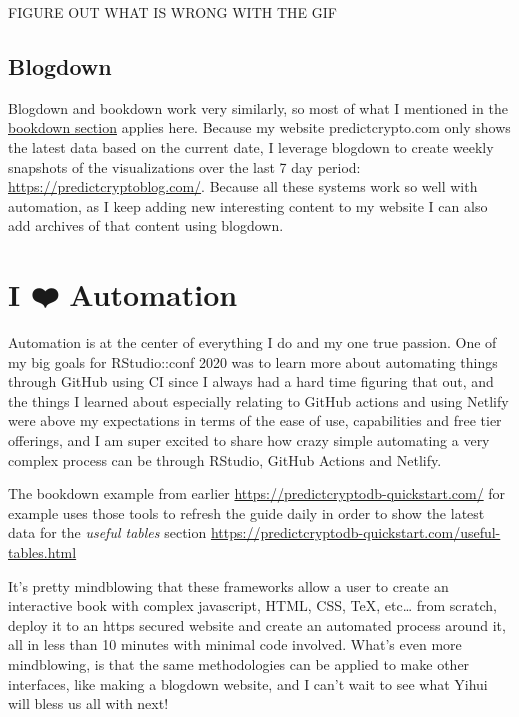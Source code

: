 \documentclass[
]{book}
\begin{document}
FIGURE OUT WHAT IS WRONG WITH THE GIF

\hypertarget{blogdown}{%
\subsection{Blogdown}\label{blogdown}}

Blogdown\citep{R-blogdown} and bookdown work very similarly, so most of what I mentioned in the \protect\hyperlink{bookdown}{bookdown section} applies here. Because my website predictcrypto.com only shows the latest data based on the current date, I leverage blogdown to create weekly snapshots of the visualizations over the last 7 day period: \url{https://predictcryptoblog.com/}. Because all these systems work so well with automation, as I keep adding new interesting content to my website I can also add archives of that content using blogdown.

\hypertarget{automation}{%
\section{I ❤️ Automation}\label{automation}}

Automation is at the center of everything I do and my one true passion. One of my big goals for RStudio::conf 2020 was to learn more about automating things through GitHub using CI since I always had a hard time figuring that out, and the things I learned about especially relating to GitHub actions and using Netlify were above my expectations in terms of the ease of use, capabilities and free tier offerings, and I am super excited to share how crazy simple automating a very complex process can be through RStudio, GitHub Actions and Netlify.

The bookdown example from earlier \url{https://predictcryptodb-quickstart.com/} for example uses those tools to refresh the guide daily in order to show the latest data for the \emph{useful tables} section \url{https://predictcryptodb-quickstart.com/useful-tables.html}

It's pretty mindblowing that these frameworks allow a user to create an interactive book with complex javascript, HTML, CSS, TeX, etc\ldots{} from scratch, deploy it to an https secured website and create an automated process around it, all in less than 10 minutes with minimal code involved. What's even more mindblowing, is that the same methodologies can be applied to make other interfaces, like making a blogdown website, and I can't wait to see what Yihui will bless us all with next!
\end{document}
